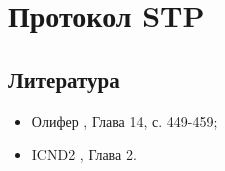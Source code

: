 \section{Протокол STP}
\subsection{Литература}
\begin{itemize}
	\item Олифер \cite{olipher}, Глава 14, с. 449-459;
	\item ICND2 \cite{icnd2eng}, Глава 2.
\end{itemize}